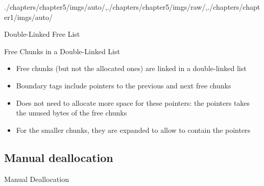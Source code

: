 \begin{graphicspathcontext}{{./chapters/chapter5/imgs/auto/},{./chapters/chapter5/imgs/raw/},{./chapters/chapter1/imgs/auto/}}
\begin{bibunit}[apalike]
\begin{frame}{Double-Linked Free List}
	\begin{small}
		\begin{definitionblock}{Free Chunks in a Double-Linked List}
			\begin{itemize}
				\item Free chunks (but not the allocated ones) are linked in a double-linked list
				\item Boundary tags include pointers to the previous and next free chunks
				\item Does not need to allocate more space for these pointers: the pointers takes the unused bytes of the free chunks
				\item For the smaller chunks, they are expanded to allow to contain the pointers
			\end{itemize}
		\end{definitionblock}
	\end{small}
	\vspace{.25cm}
	\begin{center}
	\end{center}
\end{frame}

\subsection{Manual deallocation}
\subsectiontableofcontentslide

\begin{frame}{Manual Deallocation}
	\vspace{.25cm}
\end{frame}


\end{bibunit}
\end{graphicspathcontext}
